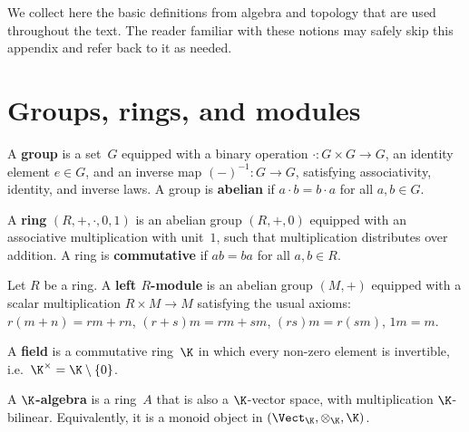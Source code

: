 \vspace{1em}

We collect here the basic definitions from algebra and topology that
are used throughout the text.  The reader familiar with these notions
may safely skip this appendix and refer back to it as needed.

\section{Groups, rings, and modules}\label{sec:app-algebra}

\begin{definition}[Group]\label{def:app-group}
A \textbf{group} is a set~$G$ equipped with a binary operation
$\cdot\colon G\times G\to G$, an identity element $e\in G$, and an
inverse map $(-)^{-1}\colon G\to G$, satisfying associativity,
identity, and inverse laws.  A group is \textbf{abelian} if
$a\cdot b = b\cdot a$ for all $a,b\in G$.
\end{definition}

\begin{definition}[Ring]\label{def:app-ring}
A \textbf{ring} $(R, +, \cdot, 0, 1)$ is an abelian group $(R,+,0)$
equipped with an associative multiplication with unit~$1$, such that
multiplication distributes over addition.  A ring is \textbf{commutative}
if $ab = ba$ for all $a,b\in R$.
\end{definition}

\begin{definition}[Module]\label{def:app-module}
Let $R$ be a ring.  A \textbf{left $R$-module} is an abelian group $(M,+)$
equipped with a scalar multiplication $R\times M\to M$ satisfying the
usual axioms: $r(m+n) = rm+rn$, $(r+s)m = rm+sm$, $(rs)m = r(sm)$,
$1m = m$.
\end{definition}

\begin{definition}[Field]\label{def:app-field}
A \textbf{field} is a commutative ring~$\K$ in which every non-zero
element is invertible, i.e.\ $\K^\times = \K\setminus\{0\}$.
\end{definition}

\begin{definition}\label{def:app-algebra}
A \textbf{$\K$-algebra} is a ring~$A$ that is also a $\K$-vector space,
with multiplication $\K$-bilinear.  Equivalently, it is a monoid object
in $(\Vect_\K, \otimes_\K, \K)$.
\end{definition}



